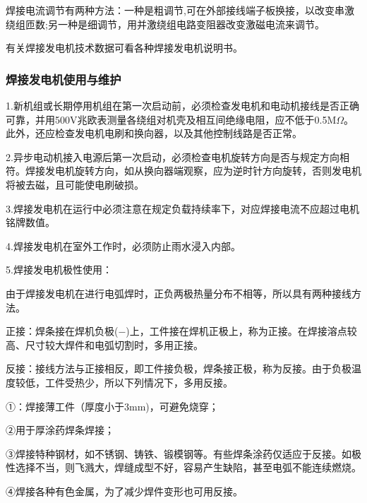 \documentclass{ctexbook}
\begin{document}
焊接电流调节有两种方法：一种是粗调节,可在外部接线端子板换接，以改变串激绕组匝数;另一种是细调节，用并激绕组电路变阻器改变激磁电流来调节。

有关焊接发电机技术数据可看各种焊接发电机说明书。
\subsubsection{焊接发电机使用与维护}
1.新机组或长期停用机组在第一次启动前，必须检查发电机和电动机接线是否正确可靠，并用500V兆欧表测量各绕组对机壳及相互间绝缘电阻，应不低于0.5M$\Omega$。此外，还应检查发电机电刷和换向器，以及其他控制线路是否正常。

2.异步电动机接入电源后第一次启动，必须检查电机旋转方向是否与规定方向相符。焊接发电机旋转方向，如从换向器端观察，应为逆时针方向旋转，否则发电机将被去磁，且可能使电刷破损。

3.焊接发电机在运行中必须注意在规定负载持续率下，对应焊接电流不应超过电机铭牌数值。

4.焊接发电机在室外工作时，必须防止雨水浸入内部。

5.焊接发电机极性使用：

由于焊接发电机在进行电弧焊时，正负两极热量分布不相等，所以具有两种接线方法。

正接：焊条接在焊机负极($-$)上，工件接在焊机正极上，称为正接。在焊接溶点较高、尺寸较大焊件和电弧切割时，多用正接。

反接：接线方法与正接相反，即工件接负极，焊条接正极，称为反接。由于负极温度较低，工件受热少，所以下列情况下，多用反接。

①：焊接薄工件（厚度小于3mm)，可避免烧穿；

②用于厚涂药焊条焊接；

③焊接特种钢材，如不锈钢、铸铁、锻模钢等。有些焊条涂药仅适应于反接。如极性选择不当，则飞溅大，焊缝成型不好，容易产生缺陷，甚至电弧不能连续燃烧。

④焊接各种有色金属，为了减少焊件变形也可用反接。
\end{document}
